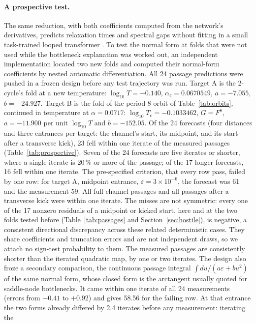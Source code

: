 \documentclass[11pt,letterpaper]{article}
\newcommand{\eps}{\varepsilon}
\begin{document}
\paragraph{A prospective test.} The same reduction, with both coefficients computed from the network's derivatives,
predicts relaxation times and spectral gaps without fitting in a small task-trained looped transformer \cite{kim2026phase}. To test the normal form at folds that were not used while the bottleneck explanation was worked out, an independent implementation located two new folds and computed their normal-form coefficients by nested automatic
differentiation. All 24 passage predictions were pushed in a frozen design before any test trajectory was run.
Target A is the 2-cycle's fold at a new temperature: $\log_{10}T=-0.140$, $\alpha_c=0.0670549$, $a=-7.055$,
$b=-24.927$. Target B is the fold of the period-8 orbit of Table~\ref{tab:orbits}, continued in temperature at
$\alpha=0.0717$: $\log_{10}T_c=-0.1033462$, $G=F^8$, $a=-11.900$ per unit $\log_{10}T$ and $b=-152.05$. Of the 24 forecasts (four distances and three entrances per target: the channel's start, its midpoint, and its start after a transverse kick), 23 fell within one iterate of the measured passages
(Table~\ref{tab:prospective}). Seven of the 24 forecasts are five iterates or shorter, where a single iterate is
20\,\% or more of the passage; of the 17 longer forecasts, 16 fell within one iterate. The pre-specified criterion, that every row pass, failed by one row: for target A,
midpoint entrance, $\eps=3\times10^{-6}$, the forecast was 61 and the measurement 59. All full-channel passages and
all passages after a transverse kick were within one iterate. The misses are not symmetric: every one of the 17
nonzero residuals of a midpoint or kicked start, here and at the two folds tested before (Table~\ref{tab:passages} and
Section~\ref{sec:hostile}), is negative, a consistent directional discrepancy across these related deterministic
cases. They share coefficients and truncation errors and are not independent draws, so we attach no sign-test
probability to them. The measured passages are consistently shorter than the iterated quadratic map, by one or two
iterates. The design also froze a secondary comparison, the continuous passage integral
$\int du/(a\eps+bu^2)$ of the same normal form, whose closed form is the arctangent usually quoted for saddle-node
bottlenecks. It came within one iterate of all 24 measurements (errors from $-0.41$ to $+0.92$) and gives 58.56 for
the failing row. At that entrance the two forms already differed by 2.4 iterates before any measurement: iterating the
\end{document}
